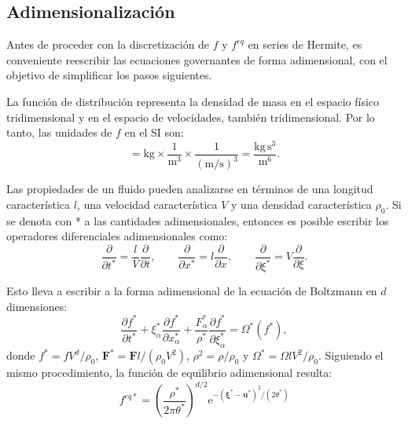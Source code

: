 \subsection{Adimensionalizaci\'on}
Antes de proceder con la discretizaci\'on de $f$ y $f^{eq}$ en series de Hermite, es conveniente reescribir las ecuaciones governantes de forma adimensional, con el objetivo de simplificar los pasos siguientes.
\par
La funci\'on de distribuci\'on \fvar{} representa la densidad de masa en el espacio f\'isico tridimensional y en el espacio de velocidades, tambi\'en tridimensional. Por lo tanto, las unidades de $f$ en el SI son:
\begin{equation}
	[f] = \mbox{kg} \times \dfrac{1}{\mbox{m}^3} \times \dfrac{1}{(\mbox{m/s})^3} = \dfrac{\mbox{kg} \, \mbox{s}^3}{\mbox{m}^6}.
\end{equation}

Las propiedades de un fluido pueden analizarse en t\'erminos de una longitud caracter\'istica $l$, una velocidad caracter\'istica $V$ y una densidad caracter\'istica $\rho_0$. Si se denota con * a las cantidades adimensionales, entonces es posible escribir los operadores diferenciales adimensionales como:
\begin{equation}
\dfrac{\partial}{\partial t^*} = \dfrac{l}{V}\dfrac{\partial}{\partial t}, \qquad
\dfrac{\partial}{\partial x^*} = l\dfrac{\partial}{\partial x}, \qquad
\dfrac{\partial}{\partial \xi^*} = V\dfrac{\partial}{\partial \xi}.
\end{equation}

Esto lleva a escribir a la forma adimensional de la ecuaci\'on de Boltzmann en $d$ dimensiones:
\begin{equation}
	\dfrac{\partial f^*}{\partial t^*}  
	+  \xi^*_{\alpha} \dfrac{\partial f^*}{\partial x^*_{\alpha}} 
	+  \dfrac{F^*_{\alpha}}{\rho^*} \dfrac{\partial f^*}{\partial \xi^*_{\alpha}} =\Omega^*(f^*),
	\label{eq:boltz_adim}
\end{equation}
donde $f^* = fV^d/\rho_0$, $\bm{F}^* = \bm{F}l/(\rho_0 V^2)$, $\rho^2 = \rho/\rho_0$ y $\Omega^*= \Omega l V^2 / \rho_0$. Siguiendo el mismo procedimiento, la funci\'on de equilibrio adimensional resulta:
\begin{equation}
	f^{eq*}	= \left( \dfrac{\rho^*}{2\pi \theta^*} \right)^{d/2} \mbox{e}^{-(\bm{\xi}^* - \bm{u}^*)^2/(2\theta^*)}
\end{equation}

